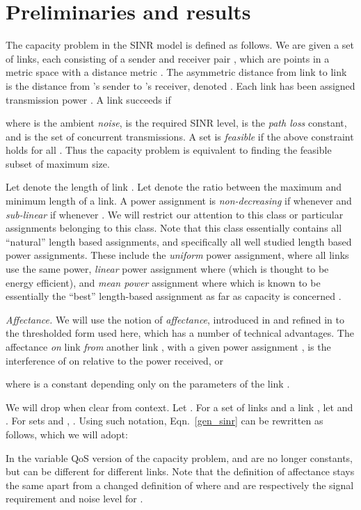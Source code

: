 \documentclass[11pt]{amsart}
\begin{document}
\section{Preliminaries and results}
\label{sec:model}

The capacity problem in the SINR model is defined as follows.
We are given a set  of  links, 
each consisting of a sender and receiver pair , 
which are points in a metric space with a distance metric .
The asymmetric distance from link  to link  is the distance from
's sender to 's receiver, denoted .
Each link  has been assigned transmission power . 
A link  succeeds if

where  is the ambient \emph{noise},  is the required SINR level,
 is the \emph{path loss} constant, and 
  is the set of concurrent transmissions. A set  is \emph{feasible} if the above constraint holds for all . Thus the capacity problem is equivalent to finding
the feasible subset  of maximum size.

Let  denote the length of link .
Let  denote the ratio between the maximum and minimum length of a link.
A power assignment  is \emph{non-decreasing} if  whenever
 and \emph{sub-linear} if  whenever . We will restrict our attention to this class or particular assignments belonging to this class. 
Note that this class essentially contains all ``natural'' length based assignments, and specifically all
 well studied length based power assignments. These include the \emph{uniform} power assignment, where all links use the same power, \emph{linear} power assignment where  (which is thought to be energy efficient), and \emph{mean power} assignment where  which is known to be 
essentially the ``best'' length-based assignment as far as capacity is concerned \cite{us:esa09full,SODA11}.

\emph{Affectance. }
We will use the notion of \emph{affectance}, introduced in
\cite{GHWW09,HW09} and refined in \cite{KV10} to the thresholded form
used here, which has a number of
technical advantages.  
The affectance  \emph{on} link  \emph{from} another link ,
with a given power assignment ,
is the interference of  on  relative to the power
received, or

where  is a constant
depending only on the parameters of the link . 

We will drop  when clear from context. 
Let .
For a set  of links and a link , 
let  and .
For sets  and , .
Using such notation, Eqn.~\ref{gen_sinr} can be rewritten as follows, which we will adopt:

In the variable QoS version of the capacity problem,  and  are no longer constants, but can be different for different links.
Note that the definition of affectance stays the same apart from a changed definition of  where  and  are respectively the signal requirement and noise level for .
\end{document}

